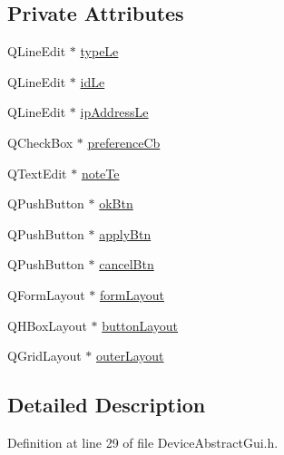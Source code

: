 \subsection*{Private Attributes}
\begin{DoxyCompactItemize}
\item 
Q\-Line\-Edit $\ast$ \hyperlink{class_device_abstract_gui_a6f430740086db96453346b28d76a22c1}{type\-Le}
\item 
Q\-Line\-Edit $\ast$ \hyperlink{class_device_abstract_gui_a00ea569f5e77e7ef80d220fa16d7425d}{id\-Le}
\item 
Q\-Line\-Edit $\ast$ \hyperlink{class_device_abstract_gui_aa4ceb1e323954c3eab8af6c480ccc27a}{ip\-Address\-Le}
\item 
Q\-Check\-Box $\ast$ \hyperlink{class_device_abstract_gui_a22b9e8623893c403d352c55110f08a27}{preference\-Cb}
\item 
Q\-Text\-Edit $\ast$ \hyperlink{class_device_abstract_gui_acebd1ea7d32d74423ce7f721dcf19985}{note\-Te}
\item 
Q\-Push\-Button $\ast$ \hyperlink{class_device_abstract_gui_ae1d682c75727c75656e2f61dd41ef32a}{ok\-Btn}
\item 
Q\-Push\-Button $\ast$ \hyperlink{class_device_abstract_gui_a9f41145f6fd4e68aac1f8f12b19b62d5}{apply\-Btn}
\item 
Q\-Push\-Button $\ast$ \hyperlink{class_device_abstract_gui_ad96194b28573843ebeb08830800a2d33}{cancel\-Btn}
\item 
Q\-Form\-Layout $\ast$ \hyperlink{class_device_abstract_gui_a7ec6dd51c843e538dee9288954ebde36}{form\-Layout}
\item 
Q\-H\-Box\-Layout $\ast$ \hyperlink{class_device_abstract_gui_a8a5741b98bcb1af6e8396909e25bdc39}{button\-Layout}
\item 
Q\-Grid\-Layout $\ast$ \hyperlink{class_device_abstract_gui_ac67bec58281fcf0ba961fcacddcdf961}{outer\-Layout}
\end{DoxyCompactItemize}


\subsection{Detailed Description}


Definition at line 29 of file Device\-Abstract\-Gui.\-h.



